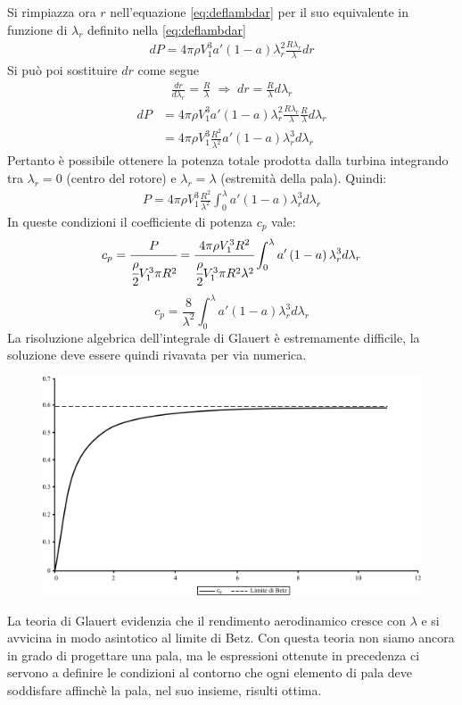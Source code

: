 Si rimpiazza ora $r$ nell'equazione \ref{eq:deflambdar} per il suo equivalente in funzione di $\lambda_r$ definito nella \ref{eq:deflambdar}
\begin{align*}
dP = 4 \pi \rho V_1^3 a' \left( 1 - a \right) \lambda_r^2 \frac{R \lambda_r}{\lambda} dr
\end{align*}
Si può poi sostituire $dr$ come segue
\begin{align*}
\frac{dr}{d \lambda_r} = \frac{R}{\lambda} \; \Rightarrow \; dr = \frac{R}{\lambda} d \lambda_r
\end{align*}
\begin{align*}
dP &= 4 \pi \rho V_1^3 a' \left(1 - a \right) \lambda_r^2 \frac{R \lambda_r}{\lambda} \frac{R}{\lambda} d \lambda_r\\
&= 4 \pi \rho V_1^3 \frac{R^2}{\lambda^2} a' \left( 1 - a \right) \lambda_r^3 d\lambda_r
\end{align*}
Pertanto è possibile ottenere la potenza totale prodotta dalla turbina integrando tra $\lambda_r = 0$ (centro del rotore) e $\lambda_r = \lambda$ (estremità della pala). Quindi:
\begin{align*}
P = 4 \pi \rho V_1^3 \frac{R^2}{\lambda^2} \int_0^{\lambda} a' \left( 1 - a \right) \lambda_r^3 d \lambda_r
\end{align*}
In queste condizioni il coefficiente di potenza $c_p$ vale:
\begin{align*}
c_p = \cfrac{P}{\cfrac{\rho}{2} V_1^3 \pi R^2} = \cfrac{4 \pi \rho V_1^3 R^2}{\cfrac{\rho}{2} V_1^3 \pi R^2 \lambda^2} \int_0^{\lambda} a' \left(1 - a \right) \lambda_r^3 d \lambda_r
\end{align*}
\begin{equation}
c_p = \frac{8}{\lambda^2} \int_0^{\lambda} a' \left( 1 - a \right) \lambda_r^3 d \lambda_r
\end{equation}
La risoluzione algebrica dell'integrale di Glauert è estremamente difficile, la soluzione deve essere quindi rivavata per via numerica.
\begin{figure}[h!]
\centering
  \includegraphics[width=.7\textwidth]{fig/limBetz.pdf}
\caption{}
\label{fig:limBetz}
\end{figure}
La teoria di Glauert evidenzia che il rendimento aerodinamico cresce con $\lambda$ e si avvicina in modo asintotico al limite di Betz. 
Con questa teoria non siamo ancora in grado di progettare una pala, ma le espressioni ottenute in precedenza ci servono a definire le condizioni al contorno che ogni elemento di pala deve soddisfare affinchè la pala, nel suo insieme, risulti ottima.

